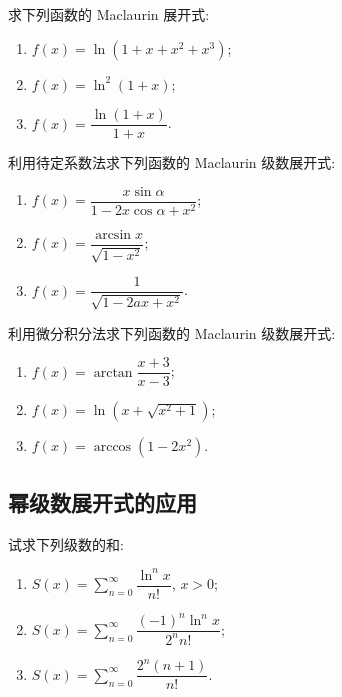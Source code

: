 \documentclass[../数学分析培优讲义.tex]{subfiles}
\begin{document}
\begin{example}
求下列函数的 Maclaurin 展开式:
\begin{enumerate}[label=(\arabic*)]
    \item $f(x)=\ln(1+x+x^2+x^3)$;
    \item $f(x)=\ln^2(1+x)$;
    \item $f(x)=\dfrac{\ln(1+x)}{1+x}$.
\end{enumerate}
\end{example}
\exampleblank

\begin{example}
利用待定系数法求下列函数的 Maclaurin 级数展开式:
\begin{enumerate}[label=(\arabic*)]
    \item $f(x)=\dfrac{x\sin\alpha}{1-2x\cos\alpha+x^2}$;
    \item $f(x)=\dfrac{\arcsin x}{\sqrt{1-x^2}}$;
    \item $f(x)=\dfrac{1}{\sqrt{1-2ax+x^2}}$.
\end{enumerate}
\end{example}
\exampleblank

\begin{example}
利用微分积分法求下列函数的 Maclaurin 级数展开式:
\begin{enumerate}[label=(\arabic*)]
    \item $f(x)=\arctan\dfrac{x+3}{x-3}$;
    \item $f(x)=\ln\left(x+\sqrt{x^2+1}\right)$;
    \item $f(x)=\arccos(1-2x^2)$.
\end{enumerate}
\end{example}
\exampleblank


\newpage

\subsection{幂级数展开式的应用}



\begin{example}
试求下列级数的和:
\begin{enumerate}[label=(\arabic*)]
    \item $\displaystyle S(x)=\sum\limits_{n=0}^{\infty}\dfrac{\ln^n x}{n!}$, $x>0$;
    \item $\displaystyle S(x)=\sum\limits_{n=0}^{\infty}\dfrac{(-1)^n\ln^n x}{2^n n!}$;
    \item $\displaystyle S(x)=\sum\limits_{n=0}^{\infty}\dfrac{2^n(n+1)}{n!}$.
\end{enumerate}
\end{example}
\exampleblank
\end{document}
